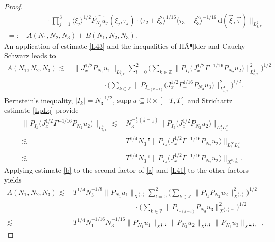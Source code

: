 \documentclass[reqno]{amsart}
\theoremstyle{Definitionl}
\theoremstyle{Definitionk}
\theoremstyle{definition}
\theoremstyle{Satzk}
\theoremstyle{Satzl}
\theoremstyle{Bemerkung}
\begin{document}
\begin{proof}
\begin{align*}
&\,\ \ \ \ \ \ \ \ \ \ \ \ \ 
\cdot\prod_{j=1}^3\langle\xi_j\rangle^{1/2}\widehat{P_{N_j}u_j}(\xi_j,\tau_j)\cdot\langle\tau_2+\xi_2^2\rangle^{1/16}\langle\tau_3-\xi_3^2\rangle^{-1/16}\,\mathrm d(\vec\xi,\vec\tau)\Big\|_{L^2_{\xi,\tau}}\\
=:&\, A(N_1,N_2,N_3)+B(N_1,N_2,N_3).
\end{align*}
An application of estimate \eqref{L43} and the inequalities of HÃ¶lder and Cauchy-Schwarz leads to
\begin{align}
A(N_1,N_2,N_3)\lesssim&\,
\Big\|J_x^{1/2}P_{N_1}u_1\Big\|_{L^{4}_{t,x}} \sum_{l=0}^2\bigg(\sum_{k\in\mathbb Z}\Big\|P_{I_k}\big(J_x^{1/2}\Gamma^{-1/16}P_{N_2}u_2\big)\Big\|_{L^{4}_{t,x}}^2\bigg)^{1/2}
\nonumber\\
&\,\ \ \ \ \ \ \ \ \ \ \ \ \ \ \ \ \ \ \ \cdot\bigg(\sum_{k\in\mathbb Z}\big\|P_{I_{-(k+l)}}\big(J_x^{1/2}\Gamma_-^{1/16} P_{N_3}u_3\big)\big\|_{L^{4}_{t,x}}^2\bigg)^{1/2}.\label{a}
\end{align}
Bernstein's inequality, $|I_k|=N_3^{-1/2}$, $\mathrm{supp}\, u\subseteq\mathbb R\times[-T,T]$ and Strichartz estimate \eqref{LpLq} provide
\begin{align}
\Big\|P_{I_k}\big(J_x^{1/2}\Gamma^{-1/16}P_{N_2}u_2\big)\Big\|_{L^{4}_{t,x}}\lesssim&\,  N_3^{-\frac12\left(\frac12-\frac14\right)}\Big\|P_{I_k}\big(J_x^{1/2}P_{N_2}u_2\big)\Big\|_{L^4_tL^2_x}\nonumber\\
\lesssim&\, T^{1/4} N_3^{-\frac{1}{8}}\Big\|P_{I_k}\big(J_x^{1/2}\Gamma^{-1/16}P_{N_2}u_2\big)\Big\|_{L^{\infty}_tL^2_x}\nonumber\\
\lesssim&\, T^{1/4} N_3^{-\frac{1}{8}}\Big\|P_{I_k}\big(J_x^{1/2}\Gamma^{-1/16}P_{N_2}u_2\big)\Big\|_{X^{0,\frac{9}{16}}}.\label{b}
\end{align}
Applying estimate \eqref{b} to the second factor of \eqref{a} and \eqref{L41} to the other factors yields
\begin{align*}
A(N_1,N_2,N_3)\lesssim&\, T^{1/4}N_3^{-1/8}\|P_{N_1}u_1\|_{X^{\frac12,\frac{1}{2}}} \sum_{l=0}^2\Big(\sum_{k\in\mathbb Z}\|P_{I_k}P_{N_2}u_2\|_{X^{\frac12,\frac12}}^2\Big)^{1/2}\\
&\,\ \ \ \ \ \ \ \ \ \ \ \ \ \ \ \ \ \ \ \ \ \ \ \ \ \ \ \ \ \ \ \ \ \ \ \ \ \ \ \cdot\Big(\sum_{k\in\mathbb Z}\|P_{I_{-(k-l)}} P_{N_3}u_3\|_{X^{\frac12,\frac12,-}}^2\Big)^{1/2}\\
\lesssim&\,T^{1/4}N_1^{-1/16}N_3^{-{1}/{16}}\|P_{N_1}u_1\|_{X^{\frac12,\frac12}}\|P_{N_2}u_2\|_{X^{\frac12,\frac12}}\|P_{N_3}u_3\|_{X^{\frac12,\frac12,-}},
\end{align*}

\end{proof}
\end{document}
